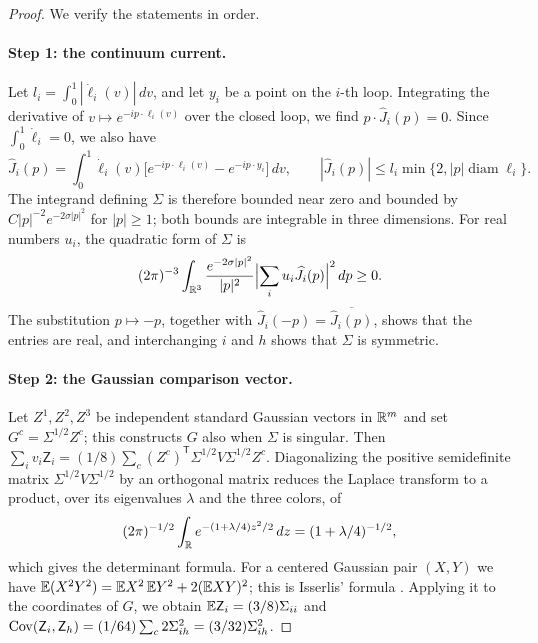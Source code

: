 \begin{proof}
We verify the statements in order.

\paragraph{Step 1: the continuum current.}
Let $l_i=\int_0^1|\dot\ell_i(v)|\,dv$, and let $y_i$ be a point on the $i$-th loop. Integrating the derivative of $v\mapsto e^{-ip\cdot\ell_i(v)}$ over the closed loop, we find $p\cdot\widehat J_i(p)=0$. Since $\int_0^1\dot\ell_i=0$, we also have
\[
 \widehat J_i(p)=\int_0^1\dot\ell_i(v)\bigl[e^{-ip\cdot\ell_i(v)}-e^{-ip\cdot y_i}\bigr]\,dv,\qquad |\widehat J_i(p)|\le l_i\min\{2,|p|\operatorname{diam}\ell_i\}.
\]
The integrand defining $\Sigma$ is therefore bounded near zero and bounded by $C|p|^{-2}e^{-2\sigma|p|^2}$ for $|p|\ge1$; both bounds are integrable in three dimensions. For real numbers $u_i$, the quadratic form of $\Sigma$ is
\[
 (2\pi)^{-3}\int_{\mathbb R^3}\frac{e^{-2\sigma|p|^2}}{|p|^2}\Bigl|\sum_iu_i\widehat J_i(p)\Bigr|^2\,dp\ge0.
\]
The substitution $p\mapsto-p$, together with $\widehat J_i(-p)=\overline{\widehat J_i(p)}$, shows that the entries are real, and interchanging $i$ and $h$ shows that $\Sigma$ is symmetric.

\paragraph{Step 2: the Gaussian comparison vector.}
Let $Z^1,Z^2,Z^3$ be independent standard Gaussian vectors in $\mathbb R^m$ and set $G^c=\Sigma^{1/2}Z^c$; this constructs $G$ also when $\Sigma$ is singular. Then $\sum_iv_i\mathsf Z_i=(1/8)\sum_c(Z^c)^{\mathsf T}\Sigma^{1/2}V\Sigma^{1/2}Z^c$. Diagonalizing the positive semidefinite matrix $\Sigma^{1/2}V\Sigma^{1/2}$ by an orthogonal matrix reduces the Laplace transform to a product, over its eigenvalues $\lambda$ and the three colors, of
\[
 (2\pi)^{-1/2}\int_\mathbb R e^{-(1+\lambda/4)z^2/2}\,dz=(1+\lambda/4)^{-1/2},
\]
which gives the determinant formula. For a centered Gaussian pair $(X,Y)$ we have $\mathbb E(X^2Y^2)=\mathbb E X^2\,\mathbb E Y^2+2(\mathbb E XY)^2$; this is Isserlis' formula \cite{Isserlis1918GaussianMoments}. Applying it to the coordinates of $G$, we obtain $\mathbb E\mathsf Z_i=(3/8)\Sigma_{ii}$ and $\operatorname{Cov}(\mathsf Z_i,\mathsf Z_h)=(1/64)\sum_c2\Sigma_{ih}^2=(3/32)\Sigma_{ih}^2$.


\end{proof}
